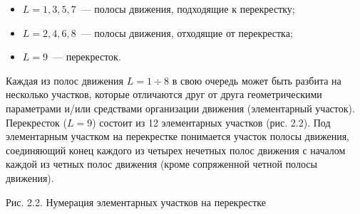 \documentclass[a4paper,14pt]{article}
\begin{document}
\begin{itemize}
\item $L = 1, 3, 5, 7$~--- полосы движения, подходящие к перекрестку;
\item $L = 2, 4, 6, 8$~--- полосы движения, отходящие от перекрестка;
\item $L = 9$~--- перекресток.
\end{itemize}
Каждая из полос движения $L=1 \div 8$ в свою очередь может быть разбита на несколько участков, которые отличаются друг от друга геометрическими параметрами и/или средствами организации движения (элементарный участок). Перекресток ($L=9$) состоит из 12 элементарных участков (рис. 2.2). Под элементарным участком на перекрестке понимается участок полосы движения, соединяющий конец каждого из четырех нечетных полос движения с началом каждой из четных полос движения (кроме сопряженной четной полосы движения).

Рис. 2.2. Нумерация элементарных участков на перекрестке

\end{document}
